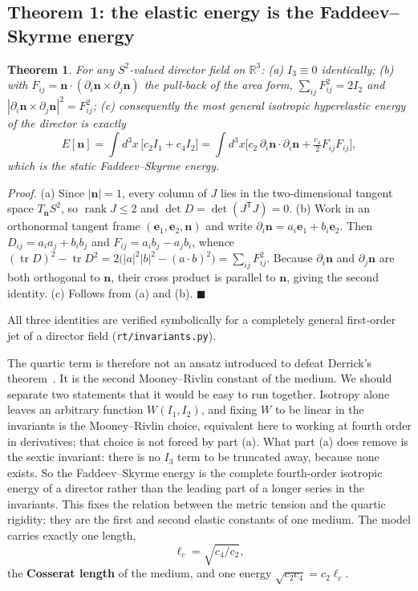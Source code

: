 \documentclass[aps,prd,preprint,nofootinbib,longbibliography]{revtex4-2}
\newtheorem{theorem}{Theorem}
\newcommand{\qed}{\hfill$\blacksquare$}
\newcommand{\nv}{\bm{n}}
\newcommand{\lc}{\ell_c}
\begin{document}
\subsection{Theorem 1: the elastic energy is the Faddeev--Skyrme energy}

\begin{theorem}
For any $S^2$-valued director field on $\mathbb{R}^3$:
(a) $I_3\equiv0$ identically;
(b) with $F_{ij}=\nv\cdot(\partial_i\nv\times\partial_j\nv)$ the pull-back of the
area form, $\sum_{ij}F_{ij}^2=2I_2$ and
$|\partial_i\nv\times\partial_j\nv|^2=F_{ij}^2$;
(c) consequently the most general isotropic hyperelastic energy of the director
is exactly
\begin{equation}
E[\nv]=\!\int\!\! d^3x\,\big[c_2I_1+c_4I_2\big]
=\!\int\!\! d^3x\Big[c_2\,\partial_i\nv\!\cdot\!\partial_i\nv
+\tfrac{c_4}{2}F_{ij}F_{ij}\Big],
\label{eq:fs}
\end{equation}
which is the static Faddeev--Skyrme energy.
\end{theorem}

\textit{Proof.} (a) Since $|\nv|=1$, every column of $J$ lies in the
two-dimensional tangent space $T_{\nv}S^2$, so $\operatorname{rank}J\le2$ and
$\det D=\det(J^{\mathsf T}J)=0$. (b) Work in an orthonormal tangent frame
$(\bm{e}_1,\bm{e}_2,\nv)$ and write
$\partial_i\nv=a_i\bm{e}_1+b_i\bm{e}_2$. Then $D_{ij}=a_ia_j+b_ib_j$ and
$F_{ij}=a_ib_j-a_jb_i$, whence
$(\operatorname{tr}D)^2-\operatorname{tr}D^2
=2\big(|a|^2|b|^2-(a\!\cdot\!b)^2\big)=\sum_{ij}F_{ij}^2$. Because
$\partial_i\nv$ and $\partial_j\nv$ are both orthogonal to $\nv$, their cross
product is parallel to $\nv$, giving the second identity. (c) Follows from (a)
and (b). \qed

All three identities are verified symbolically for a completely general
first-order jet of a director field (\texttt{rt/invariants.py}).

The quartic term is therefore not an ansatz introduced to defeat Derrick's
theorem~\cite{derrick1964}. It is the second Mooney--Rivlin constant of the
medium. We should separate two statements that it would be easy to run together.
Isotropy alone leaves an arbitrary function $W(I_1,I_2)$, and fixing $W$ to be
linear in the invariants is the Mooney--Rivlin choice, equivalent here to working
at fourth order in derivatives; that choice is not forced by part (a). What part
(a) does remove is the sextic invariant: there is no $I_3$ term to be truncated
away, because none exists. So the Faddeev--Skyrme energy is the complete
fourth-order isotropic energy of a director rather than the leading part of a
longer series in the invariants.
This fixes the relation between the metric tension and the quartic
rigidity: they are the first and second elastic constants of one medium. The
model carries exactly one length,
\begin{equation}
\lc=\sqrt{c_4/c_2},
\end{equation}
the \textbf{Cosserat length} of the medium, and one energy
$\sqrt{c_2c_4}=c_2\lc$.
\end{document}
